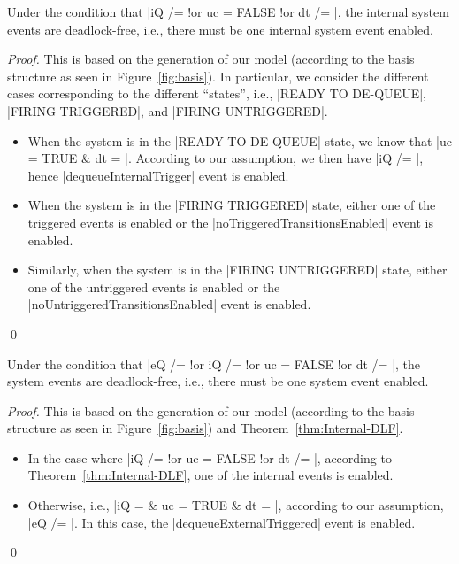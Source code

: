 \begin{theorem}
  \label{thm:Internal-DLF}
  Under the condition that %
  |iQ /= {} !or uc = FALSE !or dt /= {}|, %
  the internal system events are deadlock-free, i.e., there must be
  one internal system event enabled.
\end{theorem}
\begin{proof}
  This is based on the generation of our \EventB model (according to
  the basis structure as seen in Figure~\ref{fig:basis}).  In
  particular, we consider the different cases corresponding to the
  different ``states'', i.e., |READY TO DE-QUEUE|, |FIRING TRIGGERED|,
  and |FIRING UNTRIGGERED|.
  \begin{itemize}
  \item When the system is in the |READY TO DE-QUEUE| state, we know
    that %
    |uc = TRUE & dt = {}|.  %
    According to our assumption, we then have |iQ /= {}|, hence
    |dequeueInternalTrigger| event is enabled.
    
  \item When the system is in the |FIRING TRIGGERED| state,
    either one of the triggered events is enabled or the
    |noTriggeredTransitionsEnabled| event is enabled.
    
  \item Similarly, when the system is in the |FIRING UNTRIGGERED|
    state, either one of the untriggered events is enabled or the
    |noUntriggeredTransitionsEnabled| event is enabled.  
  \end{itemize}
  \qed
\end{proof}
    
\begin{corollary}
  Under the condition that %
  |eQ /= {} !or iQ /= {} !or uc = FALSE !or dt /= {}|, %
  the system events are deadlock-free, i.e., there must be
  one system event enabled.
\end{corollary}
\begin{proof}
  This is based on the generation of our \EventB model (according to
  the basis structure as seen in Figure~\ref{fig:basis}) and
  Theorem~\ref{thm:Internal-DLF}.
  \begin{itemize}
  \item In the case where |iQ /= {} !or uc = FALSE !or dt /= {}|,
    according to Theorem~\ref{thm:Internal-DLF}, one of the internal
    events is enabled.
    
  \item Otherwise, i.e., |iQ = {} & uc = TRUE & dt = {}|, according to
    our assumption, |eQ /= {}|. In this case, the
    |dequeueExternalTriggered| event is enabled.
  \end{itemize}
  \qed
\end{proof}

